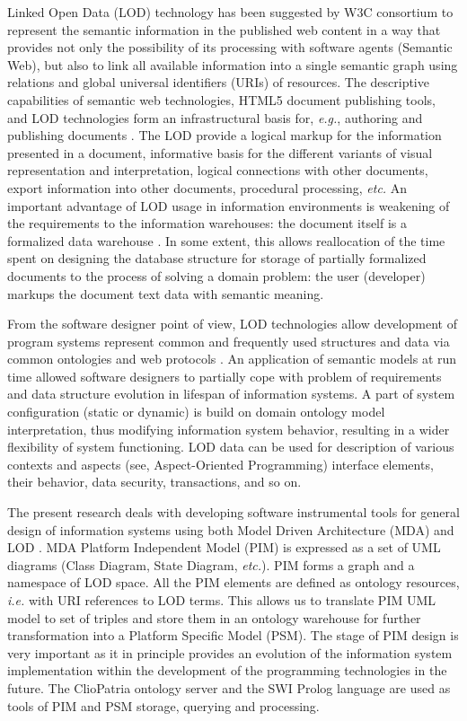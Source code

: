 \documentclass[conference,a4paper]{IEEEtran}
\begin{document}
Linked Open Data (LOD) \cite{Bizer} technology has been suggested by W3C consortium to represent the semantic information in the published web content in a way that provides not only the possibility of its processing with software agents (Semantic Web), but also to link all available information into a single semantic graph using relations and global universal identifiers (URIs) of resources. The descriptive capabilities of semantic web technologies, HTML5 document publishing tools, and LOD technologies form an infrastructural basis for, \emph{e.g.}, authoring and publishing documents \cite{Capadisli}. The LOD provide a logical markup for the information presented in a document, informative basis for the different variants of visual representation and interpretation, logical connections with other documents, export information into other documents, procedural processing, \emph{etc.} An important advantage of LOD usage in information environments is weakening of the requirements to the information warehouses: the document itself is a formalized data warehouse \cite{Cherk}. In some extent, this allows reallocation of the time spent on designing the database structure for storage of partially formalized documents to the process of solving a domain problem: the user (developer) markups the document text data with semantic meaning.

From the software designer point of view, LOD technologies allow development of program systems represent common and frequently used structures and data via common ontologies and web protocols \cite{Cherk}.  An application of semantic models at run time \cite{Kopay} allowed software designers to partially cope with problem of requirements and data structure evolution in lifespan of information systems.  A part of system configuration (static or dynamic) is build on domain ontology model interpretation, thus modifying information system behavior, resulting in a wider flexibility of system functioning.  LOD data can be used for description of various contexts and aspects (see, Aspect-Oriented Programming) interface elements, their behavior, data security, transactions, and so on.

The present research deals with developing software instrumental tools for general design of information systems using both Model Driven Architecture (MDA) and LOD \cite{MDA}.  MDA Platform Independent Model (PIM) is expressed as a set of UML diagrams (Class Diagram, State Diagram, \emph{etc.}).  PIM forms a graph and a namespace of LOD space.  All the PIM elements are defined as ontology resources, \emph{i.e.} with URI references to LOD terms.  This allows us to translate PIM UML model to set of triples and store them in an ontology warehouse for further transformation into a Platform Specific Model (PSM). The stage of PIM design is very important as it in principle provides an evolution of the information system implementation within the development of the programming technologies in the future. %
The ClioPatria ontology server and the SWI Prolog language \cite{Clio} are used as tools of PIM and PSM storage, querying and processing.
\end{document}
